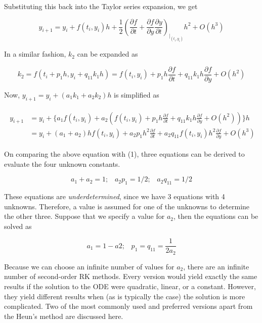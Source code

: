 \documentclass[book.tex]{subfiles}
\begin{document}
Substituting this back into the Taylor series expansion, we get

\begin{equation}
y_{i+1} = y_i + f(t_i,y_i)h + \frac{1}{2}(\frac{\partial f}{\partial t} + \frac{\partial f}{\partial y}\frac{\partial y}{\partial t})_{|_{(t_i,y_i)}}h^2 + O(h^3)
\end{equation}

In a similar fashion, $k_2$ can be expanded as

\begin{equation*}
k_2 = f(t_i + p_1h,y_i + q_{11}k_1h) = f(t_i,y_i) + p_1h\frac{\partial f}{\partial t} +  q_{11}k_1h\frac{\partial f}{\partial y} + O(h^2)
\end{equation*}

Now, $y_{i+1} = y_{i} + (a_1k_1 + a_2k_2)h$ is simplified as

\begin{eqnarray*}
\begin{split}
y_{i+1} & = y_i + \{a_1f(t_i,y_i) +  a_2(f(t_i,y_i) + p_1h\frac{\partial f}{\partial t} +  q_{11}k_1h\frac{\partial f}{\partial y} + O(h^2))\}h \\
 & = y_i + (a_1+a_2)hf(t_i,y_i) + a_2p_1h^2\frac{\partial f}{\partial t} + a_2q_{11}f(t_i,y_i)h^2\frac{\partial f}{\partial y}+ O(h^3)
\end{split}
\end{eqnarray*}

 On comparing the above equation with (1), three equations can be derived to evaluate the four unknown constants.

\begin{equation*}
		a_1 + a_2 = 1 ; \hspace{10pt}a_2p_1 = 1/2; \hspace{10pt} a_2q_{11} = 1/2
\end{equation*}

These equations are \textit{underdetermined}, since we have 3 equations with 4 unknowns. Therefore, a value is assumed for one of the unknowns to determine the other three. Suppose that we specify a value for $a_2$, then the equations can be solved as

\begin{equation*}
		a_1 = 1 - a2; \hspace{10pt} p_1 = q_{11} = \dfrac{1}{2a_2}
\end{equation*}
 
Because we can choose an infinite number of values for $a_2$, there are an infinite number of second-order RK methods. Every version would yield exactly the same results if the solution to the ODE were quadratic, linear, or a constant. However, they yield different results when (as is typically the case) the solution is more complicated. Two of the most commonly used and preferred versions apart from the Heun's method are discussed here.
\end{document}
